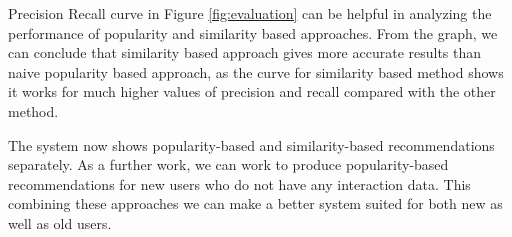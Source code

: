 \documentclass{jot}
\begin{document}
Precision Recall curve in Figure \ref{fig:evaluation} can be helpful in analyzing the performance of popularity and similarity based approaches. From the graph, we can conclude that similarity based approach gives more accurate results than naive popularity based approach, as the curve for similarity based method shows it works for much higher values of precision and recall compared with the other method.

The system now shows popularity-based and similarity-based recommendations separately. As a further work, we can work to produce popularity-based recommendations for new users who do not have any interaction data. This combining these approaches we can make a better system suited for both new as well as old users.

\backmatter

\nocite{*}



\abouttheauthors
\end{document}
